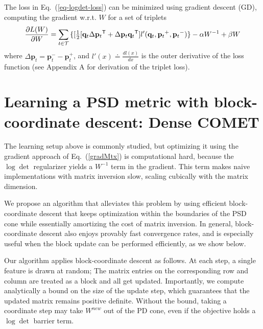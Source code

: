 \documentclass[twoside,11pt]{article}
\newcommand\mat[1]{{#1}}
\renewcommand\vec[1]{\mathbf{#1}}
\newcommand{\T}{{}^\mathsf{T}}
\newcommand{\W}{\mat{W}}
\newcommand{\newW}{{\mat{W^{new}}}}
\newcommand{\eqdef}{\doteq}
\newcommand{\q}{{\vec{q}}}
\newcommand{\p}{{\vec{p}}}
\newcommand{\trip}{{t}}
\newcommand{\qt}{{\q_{\trip}}}
\newcommand{\pt}{{\p_{\trip}}}
\newcommand{\triplet}{(\qt, \pt^{+}, \pt^{-})}
\renewcommand{\eqref}[1]{Eq.~(\ref{#1})}
\begin{document}
The loss in \eqref{eq-logdet-loss} can be minimized using gradient descent (GD), computing the gradient w.r.t. $\W$ for a set of triplets
\begin{equation}
  \frac{\partial {L (\W)}}{\partial \W} = \sum\limits_{t\in \cal{T}}{\{
  [\tfrac{1}{2}[\q_{t}\Delta\p_{t}\T + \Delta\p_{t}\q_{t}\T]  }
  {l'}\triplet\} - \alpha \W^{-1} + \beta \W
  \label{gradMtx}
\end{equation}
where $\Delta\p_t = \p_t^- - \p_t^+$, and $l'(x) \eqdef \frac{d{l(x)}}{dx}$ is the outer derivative of the loss function (see Appendix A for derivation of the triplet loss). 
\section{Learning a PSD metric with block-coordinate descent: Dense COMET}

The learning setup above is commonly studied, but 
optimizing it using the gradient approach of \eqref{gradMtx} is computational hard, because the $\log \det$ regularizer yields a $\W^{-1}$ term in the gradient. This term makes naive implementations with matrix inversion slow, scaling cubically with the matrix dimension. 

We propose an algorithm that alleviates this problem by using efficient block-coordinate descent that keeps optimization within the boundaries of the PSD cone while essentially amortizing the cost of matrix inversion.
In general, block-coordinate descent also enjoys provably fast convergence rates, and is especially useful when the block update can be performed efficiently, as we show below.

Our algorithm applies block-coordinate descent as follows. At each step, a single feature is drawn at random; The matrix entries on the corresponding row and column are treated as a block and all get updated. Importantly, we compute analytically a bound on the size of the update step, which guarantees that the updated matrix remains positive definite. Without the bound, taking a coordinate step may take $\newW$ out of the PD cone, even if the objective holds a $\log\det$ barrier term.
\end{document}
